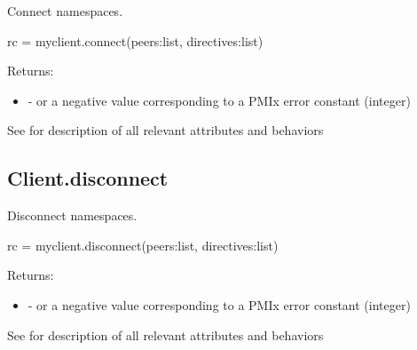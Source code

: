 \summary

Connect namespaces.

\format

\pyspecificstart
\begin{codepar}
rc = myclient.connect(peers:list, directives:list)
\end{codepar}
\pyspecificend

\begin{arglist}
\end{arglist}

Returns:

\begin{itemize}
    \item {} -  or a negative value corresponding to a PMIx error constant (integer)
\end{itemize}


See  for description of all relevant attributes and behaviors


\subsection{Client.disconnect}

\summary

Disconnect namespaces.

\format

\pyspecificstart
\begin{codepar}
rc = myclient.disconnect(peers:list, directives:list)
\end{codepar}
\pyspecificend

\begin{arglist}
\end{arglist}

Returns:

\begin{itemize}
    \item {} -  or a negative value corresponding to a PMIx error constant (integer)
\end{itemize}


See  for description of all relevant attributes and behaviors


